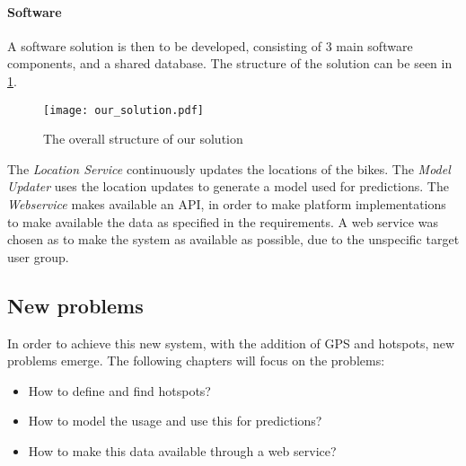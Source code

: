 \paragraph{Software}
A software solution is then to be developed, consisting of 3 main software components, and a shared database.
The structure of the solution can be seen in \cref{fig:solution_structure}.

\begin{figure}[h]
\texttt{[image: our\_solution.pdf]}
\caption{The overall structure of our solution}
\label{fig:solution_structure}
\end{figure}

The \textit{Location Service} continuously updates the locations of the bikes.
The \textit{Model Updater} uses the location updates to generate a model used for predictions.
The \textit{Webservice} makes available an API, in order to make platform implementations to make available the data as specified in the requirements.
A web service was chosen as to make the system as available as possible, due to the unspecific target user group.

\subsection{New problems}
In order to achieve this new system, with the addition of GPS and hotspots, new problems emerge.
The following chapters will focus on the problems:
\begin{itemize}
\item How to define and find hotspots?
\item How to model the usage and use this for predictions?
\item How to make this data available through a web service?
\end{itemize}
